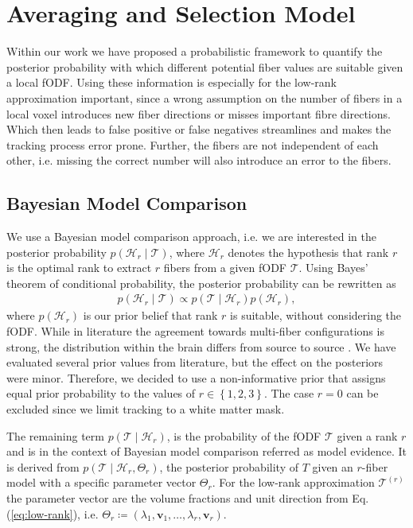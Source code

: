 \section{Averaging and Selection Model}\label{sec:Models}

Within our work we have proposed a probabilistic framework
to quantify the posterior probability with which different potential fiber values
are suitable given a local fODF.
Using these information is especially for the low-rank approximation important,
since a wrong assumption on the number of fibers in a local voxel introduces new
fiber directions or misses important fibre directions. Which then leads to false
positive or false negatives streamlines and makes the tracking process error
prone. Further, the fibers are not independent of each
other, i.e. missing the correct number will also introduce an error to the
fibers.

\subsection{Bayesian Model Comparison}
We use a Bayesian model comparison approach, i.e. we are interested in the
posterior probability $p \left( \mathcal{H}_r \mid \mathcal{T} \right)$, where
$\mathcal{H}_r$ denotes the hypothesis that rank $r$ is the optimal rank to
extract $r$ fibers from a given fODF $\mathcal{T}$. Using Bayes' theorem of
conditional probability, the posterior probability can be rewritten as
\begin{align}
	p \left( \mathcal{H}_r \mid \mathcal{T} \right) \propto p \left(
		\mathcal{T} \mid \mathcal{H}_r 
	\right) p \left(  \mathcal{H}_r \right), 
	\label{eq:Bayes}
\end{align}
where $p \left(  \mathcal{H}_r \right)$ is our prior belief that rank $r$ is
suitable, without considering the fODF. While in literature the agreement
towards multi-fiber configurations is strong, the distribution within the brain
differs from source to source  \cite{BEHRENS2007144,Jeurissen:2012, Schultz:MICCAI12}. We have evaluated several  prior values from literature,
but the effect on the posteriors were minor. Therefore, we decided to use a
non-informative prior that assigns equal prior probability to the values of $r
\in \left\{ 1,2,3 \right\}$. The case $r=0$ can be excluded since we limit
tracking to a white matter mask. 

The remaining term $p \left( \mathcal{T} \mid \mathcal{H}_r \right)$, is the
probability of the fODF $\mathcal{T}$ given a rank $r$ and is in the context of
Bayesian model comparison referred as model evidence. It is derived from $p
\left( \mathcal{T} \mid \mathcal{H}_r , \Theta_r \right)$, the posterior
probability of $T$ given an $r$-fiber model with a specific parameter vector
$\Theta_r$. For the low-rank approximation $\mathcal{T}^{\left( r \right)}$ the
parameter vector are the volume fractions and unit direction from Eq.
(\ref{eq:low-rank}), i.e. $\Theta_r \coloneqq \left( \lambda_1 , \mathbf{v}_1 , \dots
, \lambda_r , \mathbf{v}_r \right)$. 

